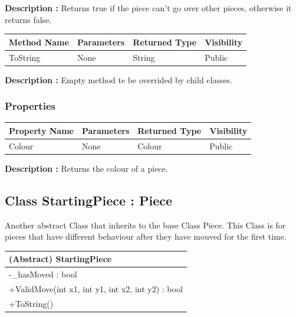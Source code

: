 \documentclass[12pt]{article}
\begin{document}
\textbf{Description :} Returns true if the piece can't go over other pieces, otherwise
it returns false.

\begin{table}[H]
    \begin{tabular}{|l|l|l|l|}
    \hline
    \rowcolor[HTML]{EFEFEF} 
    \cellcolor[HTML]{EFEFEF}\textbf{Method Name} & \textbf{Parameters}  & \textbf{Returned Type} & \textbf{Visibility} \\ \hline
    ToString                                   & None                 & String                   & Public              \\ \hline
    \end{tabular}
\end{table}

\textbf{Description :} Empty method te be overrided by child classes.

\subsubsection{Properties}

\begin{table}[H]
    \begin{tabular}{|l|l|l|l|}
    \hline
    \rowcolor[HTML]{EFEFEF} 
    \cellcolor[HTML]{EFEFEF}\textbf{Property Name} & \textbf{Parameters}  & \textbf{Returned Type} & \textbf{Visibility} \\ \hline
    Colour                                         & None                 & Colour                 & Public              \\ \hline
    \end{tabular}
\end{table}

\textbf{Description :} Returns the colour of a piece.
\newpage


\subsection{Class StartingPiece : Piece}

Another abstract Class that inherits to the base Class Piece.
This Class is for pieces that have different behaviour after they
have mouved for the first time.

\begin{table}[H]
    \begin{tabular}{|l|}
    \hline
    \cellcolor[HTML]{C0C0C0}\textbf{(Abstract) StartingPiece}            \\ \hline
    \cellcolor[HTML]{EFEFEF}-\_hasMoved : bool        \\ \hline
    +ValidMove(int x1, int y1, int x2, int y2) : bool \\ \hline
    +ToString()                                       \\ \hline
    \end{tabular}
\end{table}
\end{document}
